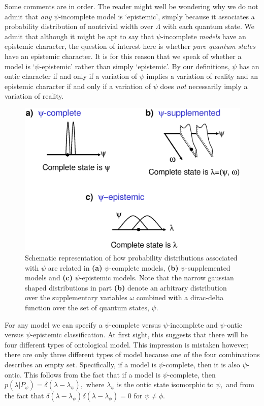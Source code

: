 \documentclass[aps,nofootinbib,12pt]{revtex4}
\begin{document}
Some comments are in order. The reader might well be wondering why
we do not admit that \emph{any} $\psi$-incomplete model is
`epistemic', simply because it associates a probability distribution
of nontrivial width over $\Lambda$ with each quantum state. We admit
that although it might be apt to say that $\psi$-incomplete
\textit{models} have an epistemic character, the question of
interest here is whether \emph{pure quantum states} have an
epistemic character. It is for this reason that we speak of whether
a model is `$\psi $-epistemic' rather than simply `epistemic'. By
our definitions, $\psi$ has an ontic character if and only if a
variation of $\psi$ implies a variation of reality and an epistemic
character if and only if a variation of $\psi$ does \emph{not}
necessarily imply a variation of reality.

\begin{figure}[t]
\includegraphics[scale=0.4]{classes2}\caption{Schematic representation of how
probability distributions associated with $\psi$ are related in
\textbf{(a)} $\psi$-complete models, \textbf{(b)}
$\psi$-supplemented models and \textbf{(c)} $\psi$-epistemic models.
Note that the narrow gaussian shaped distributions in part
\textbf{(b)} denote an arbitrary distribution over the supplementary
variables $\omega$ combined with a dirac-delta function over the set
of
quantum states, $\psi$.}%
\label{FIG:classes2}%
\end{figure}

For any model we can specify a $\psi$-complete versus
$\psi$-incomplete and $\psi$-ontic versus $\psi$-epistemic
classification. At first sight, this suggests that there will be
four different types of ontological model. This impression is
mistaken however; there are only three different types of model
because one of the four combinations describes an empty set.
Specifically, if a model is $\psi$-complete, then it is also
$\psi$-ontic. This follows from the fact that if a model is $\psi
$-complete, then $p\left(  \lambda|P_{\psi}\right) =\delta\left(
\lambda-\lambda_{\psi}\right),$ where $\lambda_{\psi}$ is the ontic
state isomorphic to $\psi,$ and from the fact that $\delta\left(
\lambda -\lambda_{\psi}\right) \delta\left(
\lambda-\lambda_{\phi}\right)  =0$ for $\psi\neq\phi$.\
\end{document}

